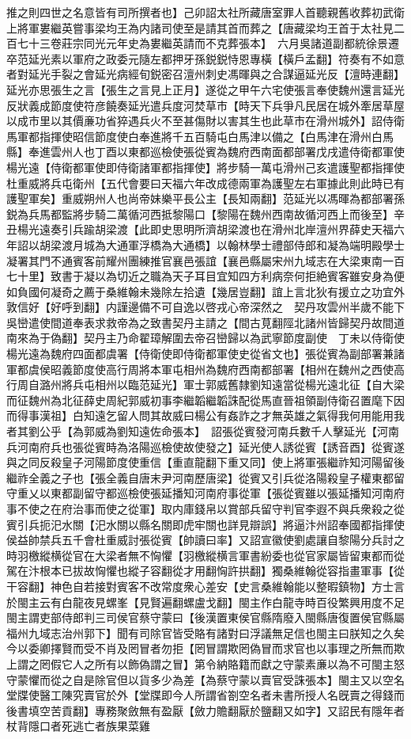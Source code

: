 推之則四世之名意皆有司所撰者也】己卯詔太社所藏唐室罪人首聽親舊收葬初武衛上將軍婁繼英嘗事梁均王為内諸司使至是請其首而葬之【唐藏梁均王首于太社見二百七十三卷莊宗同光元年史為婁繼英請而不克葬張本】　六月吳諸道副都統徐景遷卒范延光素以軍府之政委元隨左都押牙孫鋭鋭恃恩專橫【橫戶孟翻】符奏有不如意者對延光手裂之會延光病經旬鋭密召澶州刺史馮暉與之合謀逼延光反【澶時連翻】延光亦思張生之言【張生之言見上正月】遂從之甲午六宅使張言奉使魏州還言延光反狀義成節度使符彦饒奏延光遣兵度河焚草市【時天下兵爭凡民居在城外牽居草屋以成市里以其價亷功省猝遇兵火不至甚傷財以害其生也此草市在滑州城外】詔侍衛馬軍都指揮使昭信節度使白奉進將千五百騎屯白馬津以備之【白馬津在滑州白馬縣】奉進雲州人也丁酉以東都巡檢使張從賓為魏府西南面都部署戊戌遣侍衛都軍使楊光遠【侍衛都軍使即侍衛諸軍都指揮使】將步騎一萬屯滑州己亥遣護聖都指揮使杜重威將兵屯衛州【五代會要曰天福六年改成德兩軍為護聖左右軍據此則此時已有護聖軍矣】重威朔州人也尚帝妹樂平長公主【長知兩翻】范延光以馮暉為都部署孫鋭為兵馬都監將步騎二萬循河西抵黎陽口【黎陽在魏州西南故循河西上而後至】辛丑楊光遠奏引兵踰胡梁渡【此即史思明所濟胡梁渡也在滑州北岸澶州界薛史天福六年詔以胡梁渡月城為大通軍浮橋為大通橋】以翰林學士禮部侍郎和凝為端明殿學士凝署其門不通賓客前耀州團練推官襄邑張誼【襄邑縣屬宋州九域志在大梁東南一百七十里】致書于凝以為切近之職為天子耳目宜知四方利病奈何拒絶賓客雖安身為便如負國何凝奇之薦于桑維翰未幾除左拾遺【幾居豈翻】誼上言北狄有援立之功宜外敦信好【好呼到翻】内謹邊備不可自逸以啓戎心帝深然之　契丹攻雲州半歲不能下吳巒遣使間道奉表求救帝為之致書契丹主請之【間古莧翻陘北諸州皆歸契丹故間道南來為于偽翻】契丹主乃命翟璋解圍去帝召巒歸以為武寧節度副使　丁未以侍衛使楊光遠為魏府四面都虞署【侍衛使即侍衛都軍使史從省文也】張從賓為副部署兼諸軍都虞侯昭義節度使高行周將本軍屯相州為魏府西南都部署【相州在魏州之西使高行周自潞州將兵屯相州以臨范延光】軍士郭威舊隸劉知遠當從楊光遠北征【自大梁而征魏州為北征薛史周紀郭威初事李繼韜繼韜誅配從馬直晉祖領副侍衛召置麾下因而得事漢祖】白知遠乞留人問其故威曰楊公有姦詐之才無英雄之氣得我何用能用我者其劉公乎【為郭威為劉知遠佐命張本】　詔張從賓發河南兵數千人擊延光【河南兵河南府兵也張從賓時為洛陽巡檢使故使發之】延光使人誘從賓【誘音酉】從賓遂與之同反殺皇子河陽節度使重信【重直龍翻下重又同】使上將軍張繼祚知河陽留後繼祚全義之子也【張全義自唐末尹河南歷唐梁】從賓又引兵從洛陽殺皇子權東都留守重乂以東都副留守都巡檢使張延播知河南府事從軍【張從賓雖以張延播知河南府事不使之在府治事而使之從軍】取内庫錢帛以賞部兵留守判官李遐不與兵衆殺之從賓引兵扼汜水關【汜水關以縣名關即虎牢關也詳見辯誤】將逼汴州詔奉國都指揮使侯益帥禁兵五千會杜重威討張從賓【帥讀曰率】又詔宣徽使劉處讓自黎陽分兵討之時羽檄縱横從官在大梁者無不恟懼【羽檄縱横言軍書紛委也從官家屬皆留東都而從駕在汴根本已拔故恟懼也縱子容翻從才用翻恟許拱翻】獨桑維翰從容指畫軍事【從干容翻】神色自若接對賓客不改常度衆心差安【史言桑維翰能以整暇鎮物】方士言於閩主云有白龍夜見螺峯【見賢遍翻螺盧戈翻】閩主作白龍寺時百役繁興用度不足閩主謂吏部侍郎判三司侯官蔡守蒙曰【後漢置東侯官縣隋廢入閩縣唐復置侯官縣屬福州九域志治州郭下】聞有司除官皆受賂有諸對曰浮議無足信也閩主曰朕知之久矣今以委卿擇賢而受不肖及罔冒者勿拒【罔冒謂欺罔偽冒而求官也以事理之所無而欺上謂之罔假它人之所有以飾偽謂之冒】第令納賂籍而獻之守蒙素亷以為不可閩主怒守蒙懼而從之自是除官但以貨多少為差【為蔡守蒙以賣官受誅張本】閩主又以空名堂牒使醫工陳究賣官於外【堂牒即今人所謂省劄空名者未書所授人名旣賣之得錢而後書填空苦貢翻】專務聚斂無有盈厭【斂力贍翻厭於鹽翻又如字】又詔民有隱年者杖背隱口者死逃亡者族果菜雞